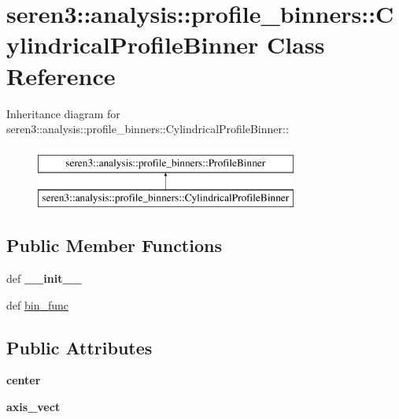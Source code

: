 \hypertarget{classseren3_1_1analysis_1_1profile__binners_1_1CylindricalProfileBinner}{
\section{seren3::analysis::profile\_\-binners::CylindricalProfileBinner Class Reference}
\label{classseren3_1_1analysis_1_1profile__binners_1_1CylindricalProfileBinner}
}
Inheritance diagram for seren3::analysis::profile\_\-binners::CylindricalProfileBinner::\begin{figure}[H]
\begin{center}
\leavevmode
\includegraphics[height=2cm]{classseren3_1_1analysis_1_1profile__binners_1_1CylindricalProfileBinner}
\end{center}
\end{figure}
\subsection*{Public Member Functions}
\begin{DoxyCompactItemize}
\item 
\hypertarget{classseren3_1_1analysis_1_1profile__binners_1_1CylindricalProfileBinner_a7ec681f48afb30eb1ab5c86c861b4108}{
def {\bfseries \_\-\_\-init\_\-\_\-}}
\label{classseren3_1_1analysis_1_1profile__binners_1_1CylindricalProfileBinner_a7ec681f48afb30eb1ab5c86c861b4108}

\item 
def \hyperlink{classseren3_1_1analysis_1_1profile__binners_1_1CylindricalProfileBinner_acb88f7dd79081c517e3eb260226d096d}{bin\_\-func}
\end{DoxyCompactItemize}
\subsection*{Public Attributes}
\begin{DoxyCompactItemize}
\item 
\hypertarget{classseren3_1_1analysis_1_1profile__binners_1_1CylindricalProfileBinner_a2ef72cc3115ee28559f3b2182536176e}{
{\bfseries center}}
\label{classseren3_1_1analysis_1_1profile__binners_1_1CylindricalProfileBinner_a2ef72cc3115ee28559f3b2182536176e}

\item 
\hypertarget{classseren3_1_1analysis_1_1profile__binners_1_1CylindricalProfileBinner_ad27a6d80d3b087883f7cc34caddd9df5}{
{\bfseries axis\_\-vect}}
\label{classseren3_1_1analysis_1_1profile__binners_1_1CylindricalProfileBinner_ad27a6d80d3b087883f7cc34caddd9df5}

\end{DoxyCompactItemize}


